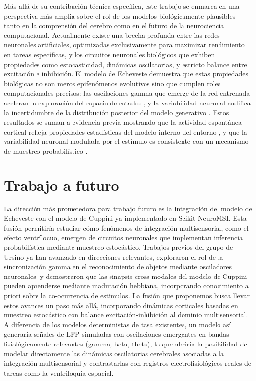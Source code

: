 Más allá de su contribución técnica específica, este trabajo se enmarca en una perspectiva más amplia sobre el rol de los modelos biológicamente plausibles tanto en la comprensión del cerebro como en el futuro de la neurociencia computacional. Actualmente existe una brecha profunda entre las redes neuronales artificiales, optimizadas exclusivamente para maximizar rendimiento en tareas específicas, y los circuitos neuronales biológicos que exhiben propiedades como estocasticidad, dinámicas oscilatorias, y estricto balance entre excitación e inhibición. El modelo de Echeveste demuestra que estas propiedades biológicas no son meros epifenómenos evolutivos sino que cumplen roles computacionales precisos: las oscilaciones gamma que emerge de la red entrenada aceleran la exploración del espacio de estados \citep{echeveste2020cortical}, y la variabilidad neuronal codifica la incertidumbre de la distribución posterior del modelo generativo \citep{echeveste2020cortical}. Estos resultados se suman a evidencia previa mostrando que la actividad espontánea cortical refleja propiedades estadísticas del modelo interno del entorno \citep{berkes2011spontaneous}, y que la variabilidad neuronal modulada por el estímulo es consistente con un mecanismo de muestreo probabilístico \citep{banyai2019stimulus}.

\section{Trabajo a futuro}

La dirección más prometedora para trabajo futuro es la integración del modelo de Echeveste con el modelo de Cuppini ya implementado en Scikit-NeuroMSI. Esta fusión permitiría estudiar cómo fenómenos de integración multisensorial, como el efecto ventrílocuo, emergen de circuitos neuronales que implementan inferencia probabilística mediante muestreo estocástico. Trabajos previos del grupo de Ursino ya han avanzado en direcciones relevantes, \citet{ursino2009recognition} exploraron el rol de la sincronización gamma en el reconocimiento de objetos mediante osciladores neuronales, y \citet{ursino2017multisensory} demostraron que las sinapsis cross-modales del modelo de Cuppini pueden aprenderse mediante maduración hebbiana, incorporando conocimiento a priori sobre la co-ocurrencia de estímulos. La fusión que proponemos busca llevar estos avances un paso más allá, incorporando dinámicas corticales basadas en muestreo estocástico con balance excitación-inhibición al dominio multisensorial. A diferencia de los modelos deterministas de tasa existentes, un modelo así generaría señales de \acrshort{LFP} simuladas con oscilaciones emergentes en bandas fisiológicamente relevantes (gamma, beta, theta), lo que abriría la posibilidad de modelar directamente las dinámicas oscilatorias cerebrales asociadas a la integración multisensorial y contrastarlas con registros electrofisiológicos reales de tareas como la ventriloquía espacial.

